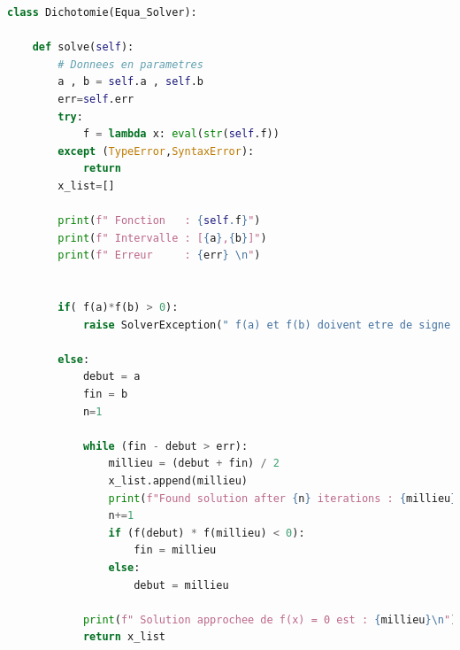 \documentclass{article}
\begin{document}
\lstset{style=mystyle}
\newpage
\begin{lstlisting}[language=Python, caption=Méthode de dichotomie en Python]
class Dichotomie(Equa_Solver):

    def solve(self):
        # Donnees en parametres
        a , b = self.a , self.b
        err=self.err
        try:
            f = lambda x: eval(str(self.f))
        except (TypeError,SyntaxError):
            return
        x_list=[]

        print(f" Fonction   : {self.f}")
        print(f" Intervalle : [{a},{b}]")
        print(f" Erreur     : {err} \n")


        if( f(a)*f(b) > 0):
            raise SolverException(" f(a) et f(b) doivent etre de signe different !")

        else:
            debut = a
            fin = b
            n=1

            while (fin - debut > err):
                millieu = (debut + fin) / 2
                x_list.append(millieu)
                print(f"Found solution after {n} iterations : {millieu} ")
                n+=1
                if (f(debut) * f(millieu) < 0):
                    fin = millieu
                else:
                    debut = millieu

            print(f" Solution approchee de f(x) = 0 est : {millieu}\n")
            return x_list
\end{lstlisting}








\newpage
\end{document}
